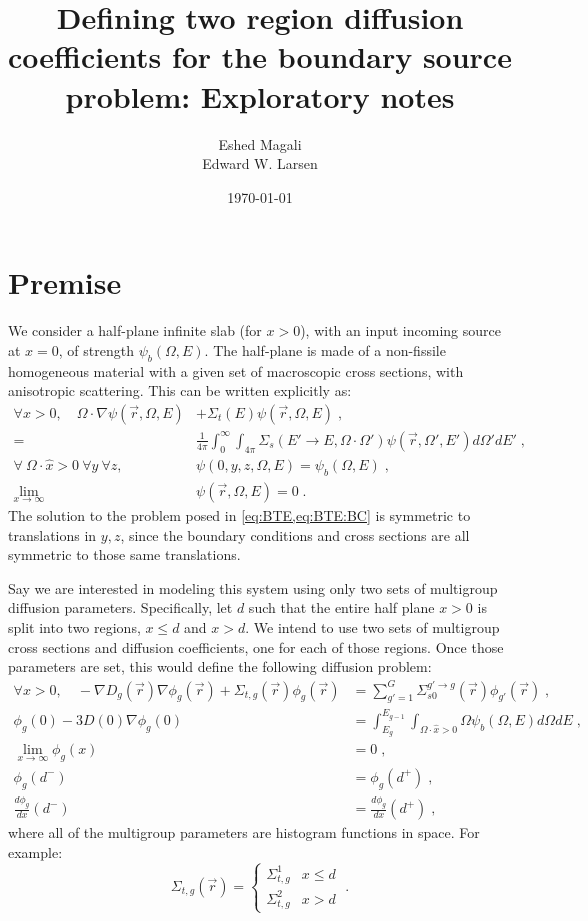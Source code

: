 \documentclass[a4paper,letterpaper,12pt,oneside,draft]{article}
\title{Defining two region diffusion coefficients for the boundary source problem: Exploratory notes}
\author{Eshed Magali \\ Edward W. Larsen}
\date{\today}
\newcommand{\eec}{\;,}
\newcommand{\eep}{\;.}
\newcommand{\intg}[2][g]{\ensuremath{\int_{E_{#1}}^{E_{#1-1}} #2 dE}}
\newcommand{\vr}{\ensuremath{\vec{r}}}
\newcommand{\psif}[1][]{\psi(\vr,\Omega#1,E#1)}
\begin{document}
\maketitle
\section{Premise}
    We consider a half-plane infinite slab (for $x>0$), with an input incoming source at $x=0$, of strength $\psi_b(\Omega,E)$. 
    The half-plane is made of a non-fissile homogeneous material with a given set of macroscopic cross sections, with anisotropic scattering. 
    This can be written explicitly as:
    \begin{align}
    \nonumber
        \forall x>0,\quad \Omega\cdot\nabla\psif &+ \Sigma_t(E)\psif \eec \\ 
    \label{eq:BTE}
        =& \frac{1}{4\pi}\int_0^\infty\int_{4\pi}\Sigma_{s}(E'\to E,\Omega\cdot\Omega')\psif[']d\Omega'dE' \eec\\
    \label{eq:BTE:BC}
        \forall\  \Omega\cdot\hat{x}>0\  \forall y\  \forall z, \quad &
        \psi(0,y,z,\Omega,E) = \psi_b(\Omega,E)\eec \\\nonumber
        \lim\limits_{x\to\infty}&\psi(\vr,\Omega,E) = 0 \eep
    \end{align}
    The solution to the problem posed in \cref{eq:BTE,eq:BTE:BC} is symmetric to translations in $y,z$, since the boundary conditions and cross sections are all symmetric to those same translations.
    
    Say we are interested in modeling this system using only two sets of multigroup diffusion parameters. Specifically, let $d$ such that the entire half plane $x>0$ is split into two regions, $x\leq d$ and $x>d$.
    We intend to use two sets of multigroup cross sections and diffusion coefficients, one for each of those regions. Once those parameters are set, this would define the following diffusion problem:
    \begin{align}
        \label{eq:Diff}
            \forall x>0, \quad-\nabla D_g(\vr)\nabla\phi_g(\vr) + \Sigma_{t,g}(\vr)\phi_g(\vr) &= \sum_{g'=1}^G\Sigma_{s0}^{g'\to g}(\vr)\phi_{g'}(\vr) \eec\\
        \label{eq:Diff:BC}
            \phi_g(0) - 3D(0)\nabla\phi_g(0) &= \intg{\int_{\Omega\cdot\hat{x}>0}\Omega\psi_b(\Omega,E)d\Omega} \eec\\
            \lim\limits_{x\to\infty}\phi_g(x) &= 0 \eec\\
        \label{eq:Diff:IC}
            \phi_g(d^-) &= \phi_g(d^+) \eec\\
            \nonumber
            \frac{d\phi_g}{dx}(d^-) &= \frac{d\phi_g}{dx}(d^+)\eec
    \end{align}
    where all of the multigroup parameters are histogram functions in space.
    For example:
    \begin{equation}
        \label{eq:TotalXS}
        \Sigma_{t,g}(\vr) = \begin{cases} \Sigma_{t,g}^1 & x\leq d \\ \Sigma_{t,g}^2 & x>d\end{cases}\eep
    \end{equation}
    
\end{document}
